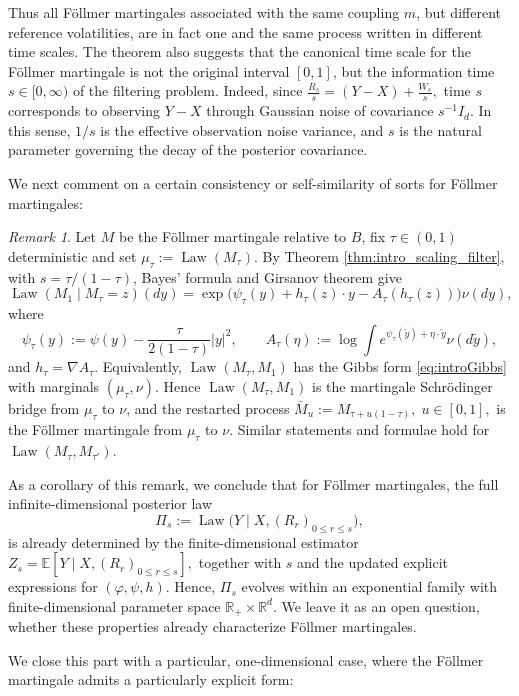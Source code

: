 \documentclass[reqno, a4paper]{amsart}
\theoremstyle{plain}
\theoremstyle{definition}
\theoremstyle{remark}
\newtheorem{remark}[theorem]{Remark}
\numberwithin{equation}{section}
\numberwithin{theorem}{section}
\newcommand{\R}{\mathbb{R}}
\newcommand{\E}{\mathbb{E}}
\newcommand{\Law}{\operatorname{Law}}
\begin{document}
	Thus all F\"ollmer martingales associated with the same coupling \(m\), but different reference volatilities, are in fact one and the same process written in different time scales. The theorem also suggests that the canonical time scale for the F\"ollmer martingale is not the original interval \([0,1]\), but the information time \(s\in[0,\infty)\) of the filtering problem.
	Indeed, since
	$\frac{R_s}{s}=(Y-X)+\frac{W_s}{s},$
	time \(s\) corresponds to observing \(Y-X\) through Gaussian noise of covariance \(s^{-1}I_d\).
	In this sense, \(1/s\) is the effective observation noise variance, and \(s\) is the natural parameter governing the decay of the posterior covariance.

       { We next comment on a certain consistency or self-similarity of sorts for Föllmer martingales:
        \begin{remark}%
Let $M$ be the Föllmer martingale relative to $B$, fix $\tau\in(0,1)$ deterministic and set $\mu_\tau:=\Law(M_\tau)$. By Theorem \ref{thm:intro_scaling_filter}, with $s=\tau/(1-\tau)$, Bayes' formula and
Girsanov theorem give
\[
\Law(M_1\mid M_\tau=z)(dy)
=
\exp\bigl(\psi_\tau(y)+h_\tau(z)\cdot y- A_\tau(h_\tau(z))\bigr)\nu(dy),
\]
where
\[
\psi_\tau(y):=\psi(y)-\frac{\tau}{2(1-\tau)}|y|^2,\qquad
A_\tau(\eta):=\log\int e^{\psi_\tau(\tilde{y})+\eta\cdot \tilde{y}}\nu(d\tilde{y}),
\]
and $h_\tau=\nabla A_\tau$. Equivalently,
$\Law(M_\tau,M_1)$ has the Gibbs form \eqref{eq:introGibbs} with marginals $(\mu_\tau,\nu)$.
Hence $\Law(M_\tau,M_1)$ is the martingale Schrödinger bridge from $\mu_\tau$ to
$\nu$, and the restarted process
$
\bar M_u:=M_{\tau+u(1-\tau)},\; u\in[0,1],
$
is the Föllmer martingale from $\mu_\tau$ to $\nu$. Similar statements and formulae hold for $\Law(M_\tau,M_{\tau '})$. 
\end{remark}
}
As a corollary of this remark, we conclude that for Föllmer martingales, the full infinite-dimensional posterior law
		\[
		\Pi_s:=\Law\big(Y\mid X,(R_r)_{0\le r\le s}\big),
		\]
is already determined by the finite-dimensional estimator $ 
		Z_s=\E[Y\mid X,(R_r)_{0\le r\le s}],
		$ 
together with $s$ and the updated explicit expressions for $(\varphi,\psi,h)$. Hence, $\Pi_s$ evolves within an exponential family with finite-dimensional parameter space $\R_+\times \R^d$. We leave it as an open question, whether these properties already characterize Föllmer martingales.
	

  
	We close this part with a particular, one-dimensional case, where the Föllmer martingale admits a particularly explicit form:
	
\end{document}
